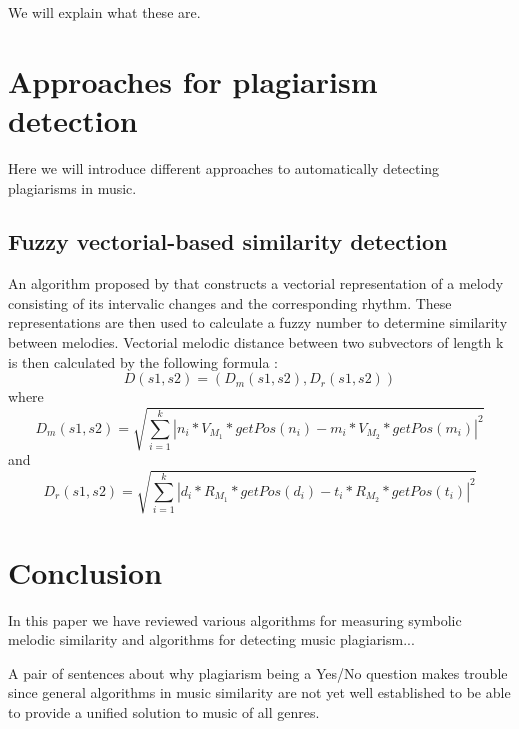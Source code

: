 \documentclass{article}
\begin{document}
					We will explain what these are.




	\section{Approaches for plagiarism detection}
	
        Here we will introduce different approaches to automatically detecting plagiarisms in music.
	
        \subsection{Fuzzy vectorial-based similarity detection}
            An algorithm proposed by \cite{five} that constructs a vectorial representation of a melody consisting of its intervalic changes and the corresponding rhythm. These representations are then used to calculate a fuzzy number to determine similarity between melodies. 
            Vectorial melodic distance between two subvectors of length k  is then calculated by the following formula : 
            \begin{equation}
                D(s1,s2)=(D_m(s1,s2),D_r(s1,s2))
            \end{equation}
            where
            \begin{equation}
             D_m(s1,s2) = \sqrt{\sum_{i=1}^k |n_i * V_{M_1} * getPos(n_i) - m_i * V_{M_2} * getPos(m_i)|^2}
            \end{equation}
            and
            \begin{equation}
               D_r(s1,s2) = \sqrt{\sum_{i=1}^k |d_i * R_{M_1} * getPos(d_i) - t_i * R_{M_2} * getPos(t_i)|^2}
            \end{equation}



            
        
        
			

	\section*{Conclusion}

		In this paper we have reviewed various algorithms for measuring symbolic melodic similarity and algorithms for detecting music plagiarism...

		A pair of sentences about why plagiarism being a Yes/No question makes trouble since general algorithms in music similarity are not yet well established to be able to provide a unified solution to music of all genres.
\end{document}
